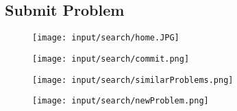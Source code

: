 \subsection{Submit Problem}

\begin{frame}
\begin{figure}[htbp]
\begin{center}
\texttt{[image: input/search/home.JPG]}
\end{center}
\end{figure}

\end{frame}

\begin{frame}

\begin{figure}[htbp]
\begin{center}
\texttt{[image: input/search/commit.png]}
\end{center}
\end{figure}

\end{frame}

\begin{frame}

\begin{figure}[htbp]
\begin{center}
\texttt{[image: input/search/similarProblems.png]}
\end{center}
\end{figure}

\end{frame}

\begin{frame}

\begin{figure}[htbp]
\begin{center}
\texttt{[image: input/search/newProblem.png]}
\end{center}
\end{figure}

\end{frame}

\newcommand{\tagone}{Computer}
\newcommand{\tagtwo}{Blue screen}
